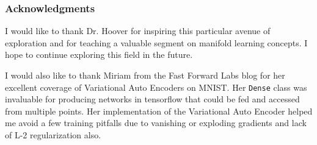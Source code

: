 \documentclass{article}
\begin{document}
\subsubsection*{Acknowledgments}

I would like to thank Dr. Hoover for inspiring this particular avenue of exploration and for teaching a valuable segment on manifold learning concepts. I hope to continue exploring this field in the future.

I would also like to thank Miriam from the Fast Forward Labs blog for her excellent coverage of Variational Auto Encoders on MNIST. Her \verb+Dense+ class was invaluable for producing networks in tensorflow that could be fed and accessed from multiple points. Her implementation of the Variational Auto Encoder helped me avoid a few training pitfalls due to vanishing or exploding gradients and lack of L-2 regularization also.  

\printbibliography
\end{document}
